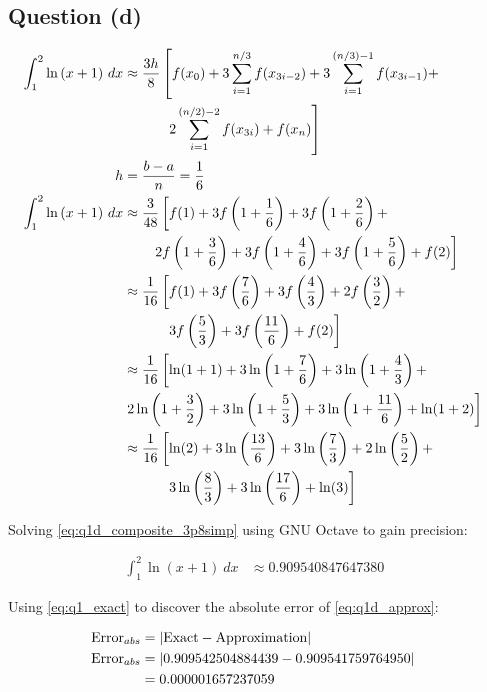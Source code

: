 	\subsection{Question (d)}
		\begin{align}
			\int_{1}^{2}\ln{(x+1)} \ dx	 &\approx  \frac{3h}{8}\left[
			f(x_{0})+
			3 \sum_{i=1}^{n/3} f(x_{3i-2}) +
			3 \sum_{i=1}^{(n/3)-1} f(x_{3i-1}) +
			\right.& \notag \\ &\left. \quad \quad \quad
			2 \sum_{i=1}^{(n/2)-2} f(x_{3i}) +
			f(x_{n})
			\right]& \\
			h &= \frac{b-a}{n} = \frac{1}{6}& \\
			\int_{1}^{2}\ln{(x+1)} \ dx	 &\approx  \frac{3}{48}\left[
				f(1)+
				3f\left(1+\frac{1}{6}\right)+
				3f\left(1+\frac{2}{6}\right)+
				\right.& \notag \\ &\left. \quad \quad
				2f\left(1+\frac{3}{6}\right)+
				3f\left(1+\frac{4}{6}\right)+
				3f\left(1+\frac{5}{6}\right)+
				f(2)
			\right]& \notag \\
			&\approx \frac{1}{16}\left[
				f(1)+
				3f\left(\frac{7}{6}\right)+
				3f\left(\frac{4}{3}\right)+
				2f\left(\frac{3}{2}\right)+
				\right.& \notag \\ &\left. \quad \quad \quad
				3f\left(\frac{5}{3}\right)+
				3f\left(\frac{11}{6}\right)+
				f(2)
			\right]& \\
			&\approx \frac{1}{16}\left[
				\ln(1+1)+
				3\ln\left(1+\frac{7}{6}\right)+
				3\ln\left(1+\frac{4}{3}\right)+
				\right.& \notag \\ &\left.
				2\ln\left(1+\frac{3}{2}\right)+
				3\ln\left(1+\frac{5}{3}\right)+
				3\ln\left(1+\frac{11}{6}\right)+
				\ln(1+2)
			\right]& \notag \\
			&\approx \frac{1}{16}\left[
				\ln(2)+
				3\ln\left(\frac{13}{6}\right)+
				3\ln\left(\frac{7}{3}\right)+
				2\ln\left(\frac{5}{2}\right)+
				\right.& \notag \\ &\left. \quad \quad \quad
				3\ln\left(\frac{8}{3}\right)+
				3\ln\left(\frac{17}{6}\right)+
				\ln(3)
			\right]& \label{eq:q1d_composite_3p8simp}
		\end{align}

		Solving \cref{eq:q1d_composite_3p8simp} using GNU Octave to gain precision:

		\begin{align}
			\int_{1}^{2}\ln{(x+1)} \ dx &\approx 0.909540847647380& \label{eq:q1d_approx}
		\end{align}

		Using \cref{eq:q1_exact} to discover the absolute error of \cref{eq:q1d_approx}:

		\begin{align}
			\text{Error}_{abs} &= |\text{Exact} - \text{Approximation}|& \\
			\text{Error}_{abs} &= |0.909542504884439 - 0.909541759764950|& \notag \\
			&= 0.000001657237059&
		\end{align}
